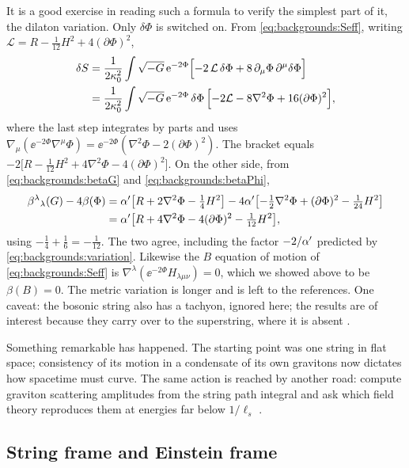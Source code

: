 It is a good exercise in reading such a formula to verify the simplest part of it, the
dilaton variation. Only $\delta\Phi$ is switched on. From \eqref{eq:backgrounds:Seff},
writing $\mathcal L=R-\tfrac1{12}H^2+4(\partial\Phi)^2$,
\begin{align*}
  \delta S&=\frac{1}{2\kappa_0^2}\int\sqrt{-G}\,\mathrm{e}^{-2\Phi}\Bigl[-2\,\mathcal L\,\delta\Phi
  +8\,\partial_\mu\Phi\,\partial^\mu\delta\Phi\Bigr]\\
  &=\frac{1}{2\kappa_0^2}\int\sqrt{-G}\,\mathrm{e}^{-2\Phi}\,\delta\Phi\,\Bigl[-2\mathcal L
  -8\nabla^2\Phi+16(\partial\Phi)^2\Bigr],
\end{align*}
where the last step integrates by parts and uses
$\nabla_\mu(\ee^{-2\Phi}\nabla^\mu\Phi)=\ee^{-2\Phi}(\nabla^2\Phi-2(\partial\Phi)^2)$. The
bracket equals $-2\bigl[R-\tfrac1{12}H^2+4\nabla^2\Phi-4(\partial\Phi)^2\bigr]$. On the other
side, from \eqref{eq:backgrounds:betaG} and \eqref{eq:backgrounds:betaPhi},
\begin{align*}
  \beta^\lambda{}_\lambda(G)-4\beta(\Phi)
  &=\alpha'\bigl[R+2\nabla^2\Phi-\tfrac14H^2\bigr]
   -4\alpha'\bigl[-\tfrac12\nabla^2\Phi+(\partial\Phi)^2-\tfrac1{24}H^2\bigr]\\
  &=\alpha'\bigl[R+4\nabla^2\Phi-4(\partial\Phi)^2-\tfrac1{12}H^2\bigr],
\end{align*}
using $-\tfrac14+\tfrac16=-\tfrac1{12}$. The two agree, including the factor $-2/\alpha'$
predicted by \eqref{eq:backgrounds:variation}. Likewise the $B$ equation of motion of
\eqref{eq:backgrounds:Seff} is $\nabla^\lambda(\ee^{-2\Phi}H_{\lambda\mu\nu})=0$, which we
showed above to be $\beta(B)=0$. The metric variation is longer and is left to the references. One caveat: the bosonic
string also has a tachyon, ignored here; the results are of interest because they carry over
to the superstring, where it is absent .

Something remarkable has happened. The starting point was one string in flat space;
consistency of its motion in a condensate of its own gravitons now dictates how spacetime
must curve. The same action is reached by another road: compute graviton scattering
amplitudes from the string path integral and ask which field theory reproduces them at
energies far below $1/\ell_s$ .

\subsection{String frame and Einstein frame}

